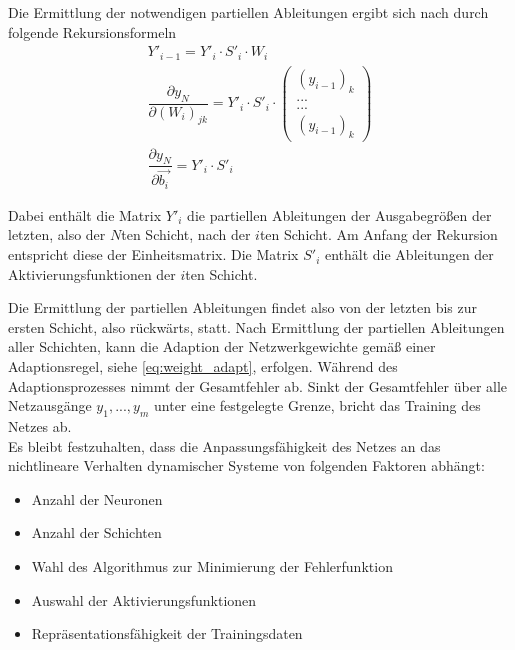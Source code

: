 Die Ermittlung der notwendigen partiellen Ableitungen ergibt sich nach \cite{Sturm.2000} durch folgende Rekursionsformeln \\

\begin{equation}
\begin{aligned}
Y'_{i-1} = Y'_i \cdot S'_i \cdot W_i \\
\dfrac{\partial y_N}{\partial (W_i)_{jk}} = Y'_i \cdot S'_i \cdot \left(\begin{array}{c}
(y_{i-1})_k  \\ ... \\ ... \\ (y_{i-1})_k 
\end{array}\right) \\
\dfrac{\partial y_N}{\partial \vec{b_i}} = Y'_i \cdot S'_i
\end{aligned}
\end{equation}

Dabei enthält die Matrix $Y'_i$ die partiellen Ableitungen der Ausgabegrößen der letzten, also der $N$ten Schicht, nach der $i$ten Schicht. Am Anfang der Rekursion entspricht diese der Einheitsmatrix. Die Matrix $S'_i$ enthält die Ableitungen der Aktivierungsfunktionen der $i$ten Schicht. \cite{Sturm.2000}


Die Ermittlung der partiellen Ableitungen findet also von der letzten bis zur ersten Schicht, also rückwärts, statt. Nach Ermittlung der partiellen Ableitungen aller Schichten, kann die Adaption der Netzwerkgewichte gemäß einer Adaptionsregel, siehe \ref{eq:weight_adapt}, erfolgen. Während des Adaptionsprozesses nimmt der Gesamtfehler ab. Sinkt der Gesamtfehler über alle Netzausgänge $y_1,...,y_m$ unter eine festgelegte Grenze, bricht das Training des Netzes ab. \\


Es bleibt festzuhalten, dass die Anpassungsfähigkeit des Netzes an das nichtlineare Verhalten dynamischer Systeme von folgenden Faktoren abhängt:

\begin{itemize}
	\item Anzahl der Neuronen
	\item Anzahl der Schichten
	\item Wahl des Algorithmus zur Minimierung der Fehlerfunktion
	\item Auswahl der Aktivierungsfunktionen
	\item Repräsentationsfähigkeit der Trainingsdaten
	
\end{itemize}


